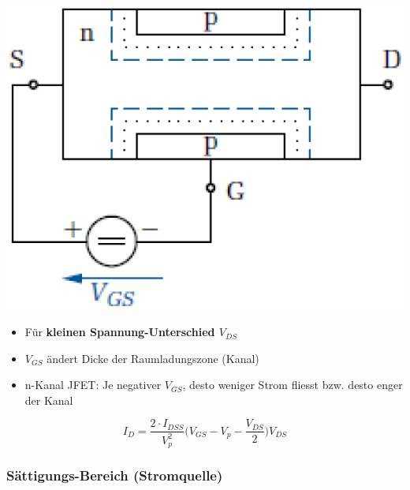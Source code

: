 \begin{minipage}[t]{0.3\columnwidth}
    \includegraphics[align=t, width=\columnwidth]{images/fet_aufbau_linearer_bereich.png}
\end{minipage}
\hfill
\begin{minipage}[t]{0.68\columnwidth}
    \begin{itemize}
        \item Für \textbf{kleinen Spannung-Unterschied $V_{DS}$}
        \item $V_{GS}$ ändert Dicke der Raumladungszone (Kanal)
        \item n-Kanal JFET: Je negativer $V_{GS}$, desto weniger Strom fliesst bzw. desto enger der Kanal
    \end{itemize}

    $$ I_D = \frac{2 \cdot I_{DSS}}{V_p^2} \Big( V_{GS} - V_p - \frac{V_{DS}}{2} \Big) V_{DS} $$
\end{minipage}


\subsubsection{Sättigungs-Bereich (Stromquelle)}

